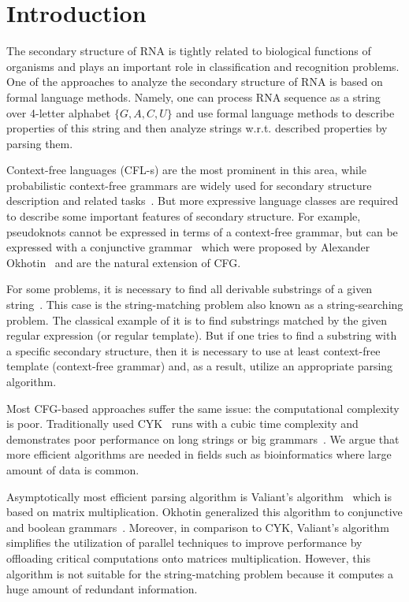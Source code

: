 \section{Introduction}

The secondary structure of RNA is tightly related to biological functions of organisms and plays an important role in classification and recognition problems.
One of the approaches to analyze the secondary structure of RNA is based on formal language methods.
Namely, one can process RNA sequence as a string over 4-letter alphabet $\{G,A,C,U\}$ and use formal language methods to describe properties of this string and then analyze strings w.r.t. described properties by parsing them. 

Context-free languages (CFL-s) are the most prominent in this area, while probabilistic context-free grammars are widely used for secondary structure description and related tasks~\cite{knudsen1999rna,dowell2004evaluation}.
But more expressive language classes are required to describe some important features of secondary structure. For example, pseudoknots cannot be expressed in terms of a context-free grammar, but can be expressed with a conjunctive grammar~\cite{zier2013rna} which were proposed by Alexander Okhotin~\cite{10.5555/543313.543323} and are the natural extension of CFG. 

For some problems, it is necessary to find all derivable substrings of a given string~\cite{durbin1996biological}.
This case is the string-matching problem also known as a string-searching problem.
The classical example of it is to find substrings matched by the given regular expression (or regular template). 
But if one tries to find a substring with a specific secondary structure, then it is necessary to use at least context-free template (context-free grammar) and, as a result, utilize an appropriate parsing algorithm. 

Most CFG-based approaches suffer the same issue: the computational complexity is poor.
Traditionally used CYK~\cite{kasami1966efficient,Younger:1966:CLP:1441427.1442019} runs with a cubic time complexity and demonstrates poor performance on long strings or big grammars~\cite{liu2005parallel}.
We argue that more efficient algorithms are needed in fields such as bioinformatics where large amount of data is common.

Asymptotically most efficient parsing algorithm is Valiant's algorithm~\cite{Valiant:1975:GCR:1739932.1740048} which is based on matrix multiplication.
Okhotin generalized this algorithm to conjunctive and boolean grammars~\cite{Okhotin:2014:PMM:2565359.2565379}. 
Moreover, in comparison to CYK, Valiant’s algorithm simplifies the utilization of parallel techniques to improve performance by offloading critical computations onto matrices multiplication.
However, this algorithm is not suitable for the string-matching problem because it computes a huge amount of redundant information.

